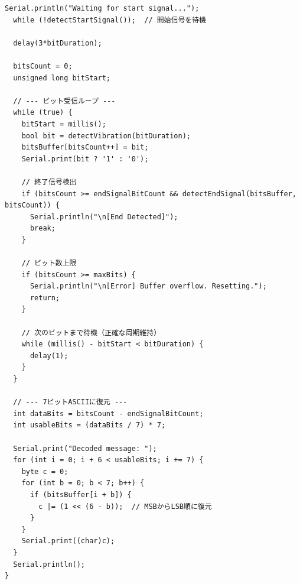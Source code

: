 \begin{lstlisting}[caption=vibration\_rcv.ino]
  Serial.println("Waiting for start signal...");
  while (!detectStartSignal());  // 開始信号を待機

  delay(3*bitDuration);

  bitsCount = 0;
  unsigned long bitStart;

  // --- ビット受信ループ ---
  while (true) {
    bitStart = millis();
    bool bit = detectVibration(bitDuration);
    bitsBuffer[bitsCount++] = bit;
    Serial.print(bit ? '1' : '0');

    // 終了信号検出
    if (bitsCount >= endSignalBitCount && detectEndSignal(bitsBuffer, bitsCount)) {
      Serial.println("\n[End Detected]");
      break;
    }

    // ビット数上限
    if (bitsCount >= maxBits) {
      Serial.println("\n[Error] Buffer overflow. Resetting.");
      return;
    }

    // 次のビットまで待機（正確な周期維持）
    while (millis() - bitStart < bitDuration) {
      delay(1);
    }
  }

  // --- 7ビットASCIIに復元 ---
  int dataBits = bitsCount - endSignalBitCount;
  int usableBits = (dataBits / 7) * 7;

  Serial.print("Decoded message: ");
  for (int i = 0; i + 6 < usableBits; i += 7) {
    byte c = 0;
    for (int b = 0; b < 7; b++) {
      if (bitsBuffer[i + b]) {
        c |= (1 << (6 - b));  // MSBからLSB順に復元
      }
    }
    Serial.print((char)c);
  }
  Serial.println();
}

\end{lstlisting}
